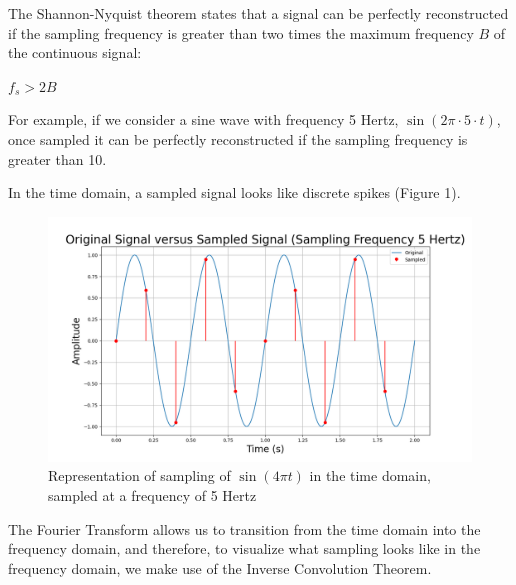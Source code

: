 \documentclass{article}
\begin{document}
The Shannon-Nyquist theorem states that a signal can be perfectly reconstructed if the sampling frequency is greater than two times the maximum frequency $B$ of the continuous signal:
\begin{center}
    \begin{math}
        f_s > 2B
    \end{math}  
\end{center}
For example, if we consider a sine wave with frequency 5 Hertz, $\sin(2\pi \cdot 5 \cdot t)$, once sampled it can be perfectly reconstructed if the sampling frequency is greater than 10.


In the time domain, a sampled signal looks like discrete spikes (Figure 1). 
\begin{figure}
    \includegraphics[width=\linewidth]{ogvssampled_BIG.png}
    \caption{Representation of sampling of $\sin(4\pi t)$ in the time domain, sampled at a frequency of 5 Hertz}
    \label{fig:grid}

\end{figure}
The Fourier Transform allows us to transition from the time domain into the frequency domain, and therefore, to visualize what sampling looks like in the frequency domain, we make use of the Inverse Convolution Theorem.
\end{document}
